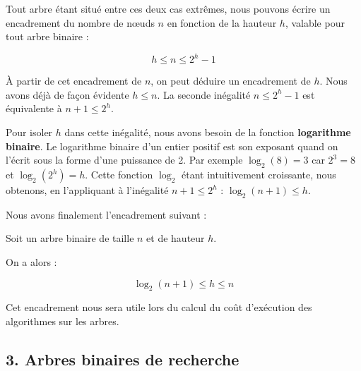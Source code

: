 \documentclass[
  a4paper,
  DIV=11,
  numbers=noendperiod]{scrartcl}
\begin{document}
Tout arbre étant situé entre ces deux cas extrêmes, nous pouvons écrire
un encadrement du nombre de nœuds \(n\) en fonction de la hauteur \(h\),
valable pour tout arbre binaire :

\[h\leqslant n\leqslant 2^h-1\]

À partir de cet encadrement de \(n\), on peut déduire un encadrement de
\(h\). Nous avons déjà de façon évidente \(h\leqslant n\). La seconde
inégalité \(n\leqslant 2^h-1\) est équivalente à \(n+1\leqslant 2^h\).

Pour isoler \(h\) dans cette inégalité, nous avons besoin de la fonction
\textbf{logarithme binaire}. Le logarithme binaire d'un entier positif
est son exposant quand on l'écrit sous la forme d'une puissance de 2.
Par exemple \(\log_2(8)=3\) car \(2^3=8\) et \(\log_2(2^h)=h\). Cette
fonction \(\log_2\) étant intuitivement croissante, nous obtenons, en
l'appliquant à l'inégalité \(n+1\leqslant 2^h\) :
\(\log_2(n+1)\leqslant h\).

Nous avons finalement l'encadrement suivant :

\begin{tcolorbox}[enhanced jigsaw, opacitybacktitle=0.6, title=\textcolor{quarto-callout-important-color}{\faExclamation}\hspace{0.5em}{Encadrement de la hauteur d'un arbre binaire}, coltitle=black, left=2mm, breakable, opacityback=0, bottomtitle=1mm, colback=white, leftrule=.75mm, rightrule=.15mm, bottomrule=.15mm, titlerule=0mm, arc=.35mm, colbacktitle=quarto-callout-important-color!10!white, toprule=.15mm, toptitle=1mm]

Soit un arbre binaire de taille \(n\) et de hauteur \(h\).

On a alors :

\[\log_2(n+1)\leqslant h\leqslant n\]

\end{tcolorbox}

Cet encadrement nous sera utile lors du calcul du coût d'exécution des
algorithmes sur les arbres.

\hypertarget{arbres-binaires-de-recherche}{%
\subsection{3. Arbres binaires de
recherche}\label{arbres-binaires-de-recherche}}
\end{document}
